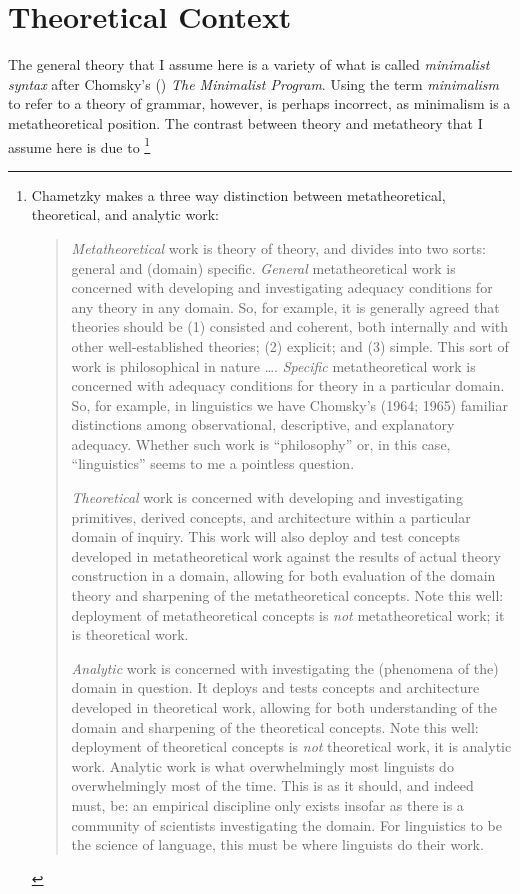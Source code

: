 \documentclass[MilwayThesis]{subfiles}
\begin{document}
\section{Theoretical Context}
The general theory that I assume here is a variety of what is called \textit{minimalist syntax} after Chomsky's (\citeyear{chomsky1995minimalist}) \textit{The Minimalist Program}.
Using the term \textit{minimalism} to refer to a theory of grammar, however, is perhaps incorrect, as minimalism is a metatheoretical position.
The contrast between theory and metatheory that I assume here is due to \textcite{chametzky1996theory}\footnote{
	Chametzky makes a three way distinction between metatheoretical, theoretical, and analytic work:
	\begin{quote}
		\textit{Metatheoretical} work is theory of theory, and divides into two sorts: general and (domain) specific.
		\textit{General} metatheoretical work is concerned with developing and investigating adequacy conditions for any theory in any domain.
		So, for example, it is generally agreed that theories should be (1) consisted and coherent, both internally and with other well-established theories; (2) explicit; and (3) simple. This sort of work is philosophical in nature \dots.
		\textit{Specific} metatheoretical work is concerned with adequacy conditions for theory in a particular domain.
		So, for example, in linguistics	we have Chomsky's (1964; 1965) familiar distinctions among observational, descriptive, and explanatory adequacy.
		Whether such work is ``philosophy'' or, in this case, ``linguistics'' seems to me a pointless question.
		
		\textit{Theoretical} work is concerned with developing and investigating primitives, derived concepts, and architecture within a particular domain of inquiry. 
		This work will also deploy and test concepts developed in metatheoretical work against the results of actual theory construction in a domain, allowing for both evaluation of the domain theory and sharpening of the metatheoretical concepts. 
		Note this well: deployment of metatheoretical concepts is \textit{not} metatheoretical work; it is theoretical work.
		
		\textit{Analytic} work is concerned with investigating the (phenomena of the) domain in question.
		It deploys and tests concepts and architecture developed in theoretical work, allowing for both understanding of the domain and sharpening of the theoretical concepts. 
		Note this well: deployment of theoretical concepts is \textit{not} theoretical work, it is analytic work. 
		Analytic work is what overwhelmingly most linguists do overwhelmingly most of the time.
		This is as it should, and indeed must, be: an empirical discipline only exists insofar as there is a community of scientists investigating the domain.
		For linguistics to be the science of language, this must be where linguists do their work.
		\parencite[xvii\textit{ff}]{chametzky1996theory}
	\end{quote}
	}
\end{document}
